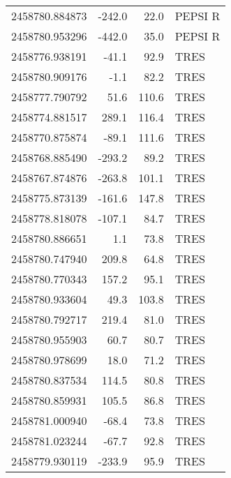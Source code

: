 \begin{tabular}{rrrl}
2458780.884873 &   -242.0 &           22.0 &    PEPSI R \\
2458780.953296 &   -442.0 &           35.0 &    PEPSI R \\
2458776.938191 &    -41.1 &           92.9 &       TRES \\
2458780.909176 &     -1.1 &           82.2 &       TRES \\
2458777.790792 &     51.6 &          110.6 &       TRES \\
2458774.881517 &    289.1 &          116.4 &       TRES \\
2458770.875874 &    -89.1 &          111.6 &       TRES \\
2458768.885490 &   -293.2 &           89.2 &       TRES \\
2458767.874876 &   -263.8 &          101.1 &       TRES \\
2458775.873139 &   -161.6 &          147.8 &       TRES \\
2458778.818078 &   -107.1 &           84.7 &       TRES \\
2458780.886651 &      1.1 &           73.8 &       TRES \\
2458780.747940 &    209.8 &           64.8 &       TRES \\
2458780.770343 &    157.2 &           95.1 &       TRES \\
2458780.933604 &     49.3 &          103.8 &       TRES \\
2458780.792717 &    219.4 &           81.0 &       TRES \\
2458780.955903 &     60.7 &           80.7 &       TRES \\
2458780.978699 &     18.0 &           71.2 &       TRES \\
2458780.837534 &    114.5 &           80.8 &       TRES \\
2458780.859931 &    105.5 &           86.8 &       TRES \\
2458781.000940 &    -68.4 &           73.8 &       TRES \\
2458781.023244 &    -67.7 &           92.8 &       TRES \\
2458779.930119 &   -233.9 &           95.9 &       TRES \\
\bottomrule
\end{tabular}
